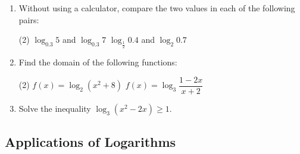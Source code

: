\documentclass{report}
\begin{document}
			\newpage
			\begin{enumerate}
				\item Without using a calculator, compare the two values in each of the following pairs:
				      \begin{tasks}[label=(\alph*)](2)
				      	\task $\log _{0.3} 5$ and $\log _{0.3} 7$
				      	\task $\log _{\frac{1}{2}} 0.4$ and $\log _2 0.7$
				      \end{tasks}
				\item Find the domain of the following functions:
				      \begin{tasks}[label=(\alph*)](2)
				      	\task $f(x)=\log _2\left(x^2+8\right)$
				      	\task $f(x)=\log _3 \dfrac{1-2 x}{x+2}$
				      \end{tasks}
				\item Solve the inequality $\log _3\left(x^2-2 x\right) \geq 1$.
			\end{enumerate}
			
			\subsection*{Applications of Logarithms}
			
\end{document}
